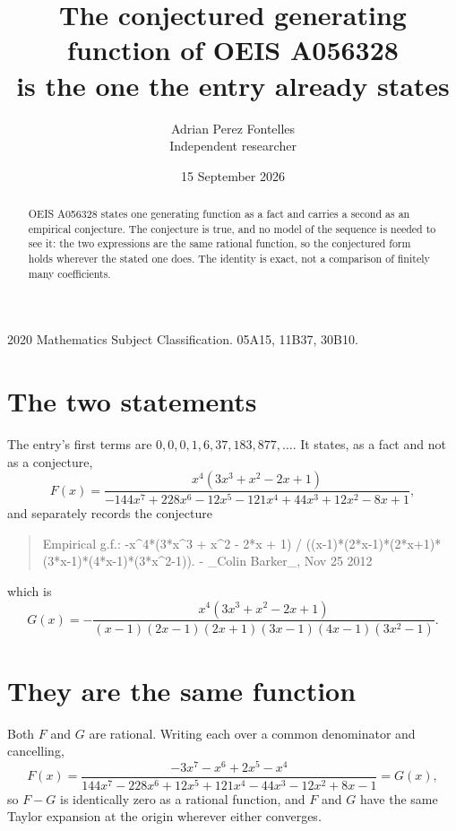 \documentclass[11pt,a4paper]{article}
\title{The conjectured generating function of OEIS A056328\\ \large is the one the entry already
states}
\author{Adrian Perez Fontelles\\ \small Independent researcher}
\date{15 September 2026}
\theoremstyle{plain}
\theoremstyle{definition}
\begin{document}
\maketitle

\begin{abstract}
OEIS A056328 states one generating function as a fact and carries a second as an empirical
conjecture. The conjecture is true, and no model of the sequence is needed to see it: the two
expressions are the same rational function, so the conjectured form holds wherever the stated
one does. The identity is exact, not a comparison of finitely many coefficients.
\end{abstract}

\noindent\small 2020 Mathematics Subject Classification. 05A15, 11B37, 30B10.\normalsize

\section{The two statements}

The entry's first terms are $0, 0, 0, 1, 6, 37, 183, 877,\dots$. It states, as a fact and not as a conjecture,
\[
  F(x)=\frac{x^{4} \left(3 x^{3} + x^{2} - 2 x + 1\right)}{- 144 x^{7} + 228 x^{6} - 12 x^{5} - 121 x^{4} + 44 x^{3} + 12 x^{2} - 8 x + 1} ,
\]
and separately records the conjecture

\begin{quote}\raggedright Empirical g.f.: -x\^{}4*(3*x\^{}3 + x\^{}2 - 2*x + 1) / ((x-1)*(2*x-1)*(2*x+1)*(3*x-1)*(4*x-1)*(3*x\^{}2-1)). - \_Colin Barker\_, Nov 25 2012\end{quote}

\noindent which is
\[
  G(x)=- \frac{x^{4} \left(3 x^{3} + x^{2} - 2 x + 1\right)}{\left(x - 1\right) \left(2 x - 1\right) \left(2 x + 1\right) \left(3 x - 1\right) \left(4 x - 1\right) \left(3 x^{2} - 1\right)} .
\]

\section{They are the same function}

Both $F$ and $G$ are rational. Writing each over a common denominator and cancelling,
\[
  F(x)=\frac{- 3 x^{7} - x^{6} + 2 x^{5} - x^{4}}{144 x^{7} - 228 x^{6} + 12 x^{5} + 121 x^{4} - 44 x^{3} - 12 x^{2} + 8 x - 1}=G(x) ,
\]
so $F-G$ is identically zero as a rational function, and $F$ and $G$ have the same Taylor
expansion at the origin wherever either converges.
\end{document}
